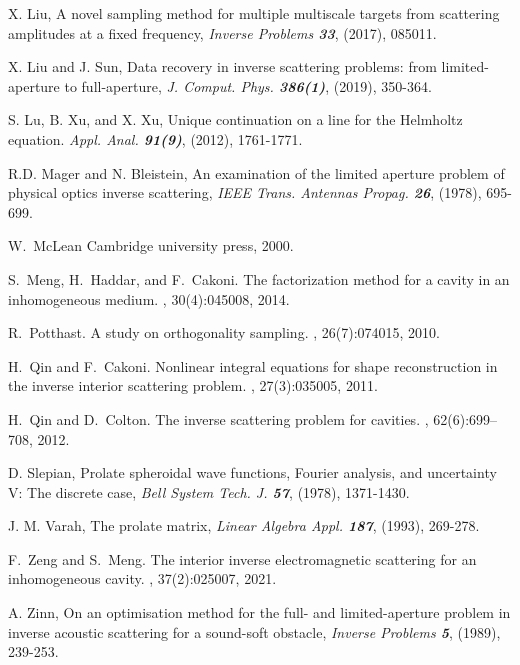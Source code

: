\documentclass[final]{siamltex}
\begin{document}
\begin{thebibliography}{10}
 X. Liu,
	A novel sampling method for multiple multiscale targets from scattering amplitudes at a fixed frequency,
	{\em Inverse Problems \bf33}, (2017), 085011.

X. Liu and J. Sun,
    Data recovery in inverse scattering problems: from limited-aperture to full-aperture,
    {\em J. Comput. Phys. \bf386(1)}, (2019), 350-364.



     S. Lu, B. Xu, and X. Xu,
	Unique continuation on a line for the Helmholtz equation.
	{\em Appl. Anal. \bf91(9)}, (2012), 1761-1771.

 R.D. Mager and N. Bleistein,
	An examination of the limited aperture problem of physical optics inverse scattering, {\em IEEE Trans.
	 Antennas Propag. \bf26}, (1978), 695-699.

W.~McLean
\newblock Cambridge university press, 2000.	
	
S.~Meng, H.~Haddar, and F.~Cakoni.
\newblock The factorization method for a cavity in an inhomogeneous medium.
, 30(4):045008, 2014.

R.~Potthast.
\newblock A study on orthogonality sampling.
, 26(7):074015, 2010.


H.~Qin and F.~Cakoni.
\newblock Nonlinear integral equations for shape reconstruction in the inverse
  interior scattering problem.
, 27(3):035005, 2011.

H.~Qin and D.~Colton.
\newblock The inverse scattering problem for cavities.
, 62(6):699--708, 2012.



D. Slepian,
Prolate spheroidal wave functions, Fourier analysis, and uncertainty V: The discrete case,
{\em Bell System Tech. J. \bf57}, (1978), 1371-1430.

J. M. Varah,
The prolate matrix,
{\em Linear Algebra Appl. \bf187}, (1993), 269-278.



F.~Zeng and S.~Meng.
\newblock The interior inverse electromagnetic scattering for an inhomogeneous cavity.
, 37(2):025007, 2021.


A. Zinn,
On an optimisation method for the full- and limited-aperture problem in inverse acoustic scattering for a sound-soft obstacle,
{\em Inverse Problems \bf5}, (1989), 239-253.

\end{thebibliography}
\end{document}

